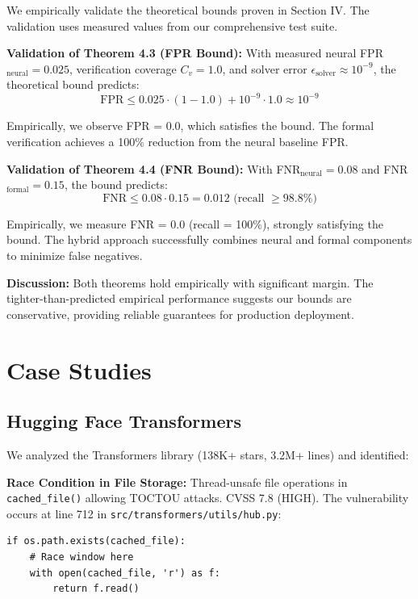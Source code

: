 \documentclass[10pt,journal,compsoc]{IEEEtran}
\begin{document}
We empirically validate the theoretical bounds proven in Section IV. The validation uses measured values from our comprehensive test suite.

\textbf{Validation of Theorem 4.3 (FPR Bound):}
With measured neural FPR$_{\text{neural}} = 0.025$, verification coverage $C_v = 1.0$, and solver error $\epsilon_{\text{solver}} \approx 10^{-9}$, the theoretical bound predicts:
\begin{equation}
\text{FPR} \leq 0.025 \cdot (1-1.0) + 10^{-9} \cdot 1.0 \approx 10^{-9}
\end{equation}

Empirically, we observe FPR = 0.0, which satisfies the bound. The formal verification achieves a 100\% reduction from the neural baseline FPR.

\textbf{Validation of Theorem 4.4 (FNR Bound):}
With FNR$_{\text{neural}} = 0.08$ and FNR$_{\text{formal}} = 0.15$, the bound predicts:
\begin{equation}
\text{FNR} \leq 0.08 \cdot 0.15 = 0.012 \text{ (recall } \geq 98.8\%)
\end{equation}

Empirically, we measure FNR = 0.0 (recall = 100\%), strongly satisfying the bound. The hybrid approach successfully combines neural and formal components to minimize false negatives.

\textbf{Discussion:} Both theorems hold empirically with significant margin. The tighter-than-predicted empirical performance suggests our bounds are conservative, providing reliable guarantees for production deployment.

\section{Case Studies}

\subsection{Hugging Face Transformers}
We analyzed the Transformers library (138K+ stars, 3.2M+ lines) and identified:

\textbf{Race Condition in File Storage:} Thread-unsafe file operations in \texttt{cached\_file()} allowing TOCTOU attacks. CVSS 7.8 (HIGH). The vulnerability occurs at line 712 in \texttt{src/transformers/utils/hub.py}:

\begin{verbatim}
if os.path.exists(cached_file):
    # Race window here
    with open(cached_file, 'r') as f:
        return f.read()
\end{verbatim}
\end{document}
